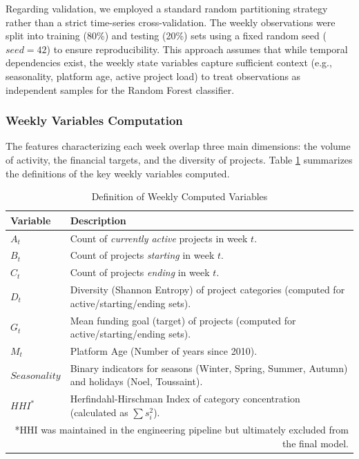 Regarding validation, we employed a standard random partitioning strategy rather than a strict time-series cross-validation. The weekly observations were split into training (80\%) and testing (20\%) sets using a fixed random seed ($seed=42$) to ensure reproducibility. This approach assumes that while temporal dependencies exist, the weekly state variables capture sufficient context (e.g., seasonality, platform age, active project load) to treat observations as independent samples for the Random Forest classifier.

\subsubsection{Weekly Variables Computation}
The features characterizing each week overlap three main dimensions: the volume of activity, the financial targets, and the diversity of projects. Table \ref{tab:weekly_variables} summarizes the definitions of the key weekly variables computed.

\begin{table}[htbp]
\caption{Definition of Weekly Computed Variables}
\label{tab:weekly_variables}
\centering
\begin{tabular}{l l} 
\toprule
\textbf{Variable} & \textbf{Description} \\ 
\midrule
$A_t$ & Count of \textit{currently active} projects in week $t$. \\
$B_t$ & Count of projects \textit{starting} in week $t$. \\
$C_t$ & Count of projects \textit{ending} in week $t$. \\
$D_t$ & Diversity (Shannon Entropy) of project categories (computed for active/starting/ending sets). \\
$G_t$ & Mean funding goal (target) of projects (computed for active/starting/ending sets). \\
$M_t$ & Platform Age (Number of years since 2010). \\
$Seasonality$ & Binary indicators for seasons (Winter, Spring, Summer, Autumn) and holidays (Noel, Toussaint). \\
$HHI^*$ & Herfindahl-Hirschman Index of category concentration (calculated as $\sum s_i^2$). \\
\bottomrule
\multicolumn{2}{r}{\footnotesize{*HHI was maintained in the engineering pipeline but ultimately excluded from the final model.}}
\end{tabular}
\end{table}

